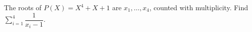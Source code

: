 The roots of $P(X)=X^4+X+1$ are $x_1,\ldots,x_4$, counted with multiplicity. Find $\sum_{i=1}^4\dfrac{1}{x_i-1}$.
